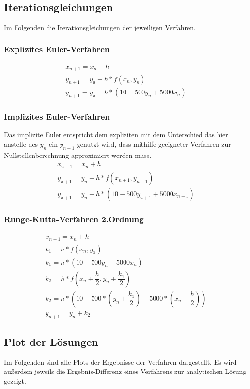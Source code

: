 \documentclass[]{scrartcl}
\begin{document}
\subsection{Iterationsgleichungen}
Im Folgenden die Iterationsgleichungen der jeweiligen Verfahren.

\subsubsection{Explizites Euler-Verfahren}
\begin{align}
x_{n+1} = x_{n}+h \\
y_{n+1} = y_{n}+h*f(x_{n},y_{n}) \\
y_{n+1} = y_{n}+h*(10-500y_{n}+5000x_{n})
\end{align}

\subsubsection{Implizites Euler-Verfahren}
Das implizite Euler entspricht dem expliziten mit dem Unterschied das hier anstelle des $y_{n}$ ein $y_{n+1}$ genutzt wird, dass mithilfe geeigneter Verfahren zur Nullstellenberechnung approximiert werden muss. 
\begin{align}
x_{n+1} = x_{n}+h \\
y_{n+1} = y_{n}+h*f(x_{n+1},y_{n+1}) \\
y_{n+1} = y_{n}+h*(10-500y_{n+1}+5000x_{n+1})
\end{align}

\subsubsection{Runge-Kutta-Verfahren 2.Ordnung}
\begin{align}
x_{n+1} = x_{n}+h \\
k_{1} = h*f(x_{n},y_{n}) \\
k_{1} = h*(10-500y_{n}+5000x_{n}) \\
k_{2} = h*f(x_{n} + \dfrac{h}{2},y_{n} + \dfrac{k_{1}}{2}) \\
k_{2} = h*(10-500*(y_{n} + \dfrac{k_{1}}{2})+5000*(x_{n} + \dfrac{h}{2})) \\
y_{n+1} = y_{n}+k_{2}
\end{align}

\subsection{Plot der Lösungen}
Im Folgenden sind alle Plots der Ergebnisse der Verfahren dargestellt. Es wird außerdem jeweils die Ergebnis-Differenz eines Verfahrens zur analytischen Lösung gezeigt.
\end{document}
